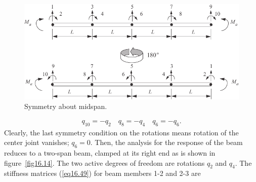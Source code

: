 \documentclass{AeroStructure-ERJohnson}
\begin{document}
\begin{example}
\begin{figure}
\centerline{\includegraphics{Figure_16-13.pdf}}
\caption{Symmetry about midspan.}\label{fig16.13}
\end{figure}

\vspace*{-2pc}

\begin{align}\label{eq16.6b}\tag{b}
q_{10}=-q_{2} \quad q_{8}=-q_{4} \quad q_{6}=-q_{6}.
\end{align}
\noindent Clearly, the last symmetry condition on the rotations means rotation of the center joint vanishes; $q_{6}=0$. Then, the analysis for the response of the beam reduces to a two-span beam, clamped at its right end as is shown in figure~\ref{fig16.14}. The two active degrees of freedom are rotations $q_{2}$ and $q_{4}$. The stiffness matrices (\ref{eq16.49}) for beam members 1-2 and 2-3 are


\vspace*{-1.8pc}


\end{example}
\end{document}
